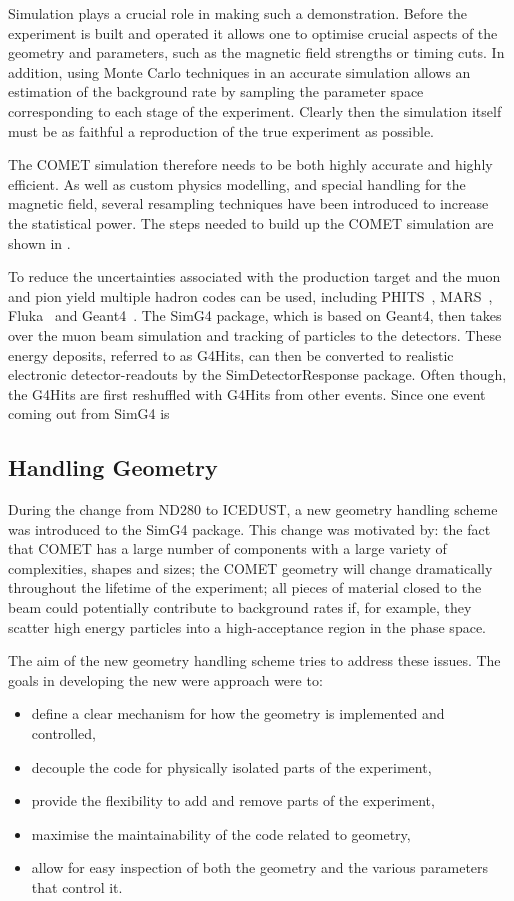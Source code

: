 Simulation plays a crucial role in making such a demonstration. 
Before the experiment is built and operated it allows one to optimise crucial aspects of the geometry and parameters, such as the magnetic field strengths or timing cuts.
In addition, using Monte Carlo techniques in an accurate simulation allows an estimation of the background rate by sampling the parameter space corresponding to each stage of the experiment.
Clearly then the simulation itself must be as faithful a reproduction of the true experiment as possible.


The COMET simulation therefore needs to be both highly accurate and highly efficient.
As well as custom physics modelling, and special handling for the magnetic field, several resampling techniques have been introduced to increase the statistical power.
The steps needed to build up the COMET simulation are shown in .

To reduce the uncertainties associated with the production target and the muon and pion yield multiple hadron codes can be used, including PHITS~\cite{PHITS2002}, MARS~\cite{MARS1995}, Fluka~\cite{FLUKA2005} and Geant4~\cite{Geant42003}.
The SimG4 package, which is based on Geant4, then takes over the muon beam simulation and tracking of particles to the detectors.
These energy deposits, referred to as G4Hits, can then be converted to realistic electronic detector-readouts by the SimDetectorResponse package.
Often though, the G4Hits are first reshuffled with G4Hits from other events.  
Since one event coming out from SimG4 is 

\subsection{Handling Geometry}
During the change from ND280 to ICEDUST, a new geometry handling scheme was introduced to the SimG4 package.
This change was motivated by: 
    the fact that COMET has a large number of components with a large variety of complexities, shapes and sizes;
    the COMET geometry will change dramatically throughout the lifetime of the experiment;
    all pieces of material closed to the beam could potentially contribute to background rates if, for example, they scatter high energy particles into a high-acceptance region in the phase space.

The aim of the new geometry handling scheme tries to address these issues.
The goals in developing the new were approach were to:
\begin{itemize}
\setlength{\itemsep}{-1ex}
\item define a clear mechanism for how the geometry is implemented and controlled,
\item decouple the code for physically isolated parts of the experiment,
\item provide the flexibility to add and remove parts of the experiment,
\item maximise the maintainability of the code related to geometry,
\item allow for easy inspection of both the geometry and the various parameters that control it.
\end{itemize}

